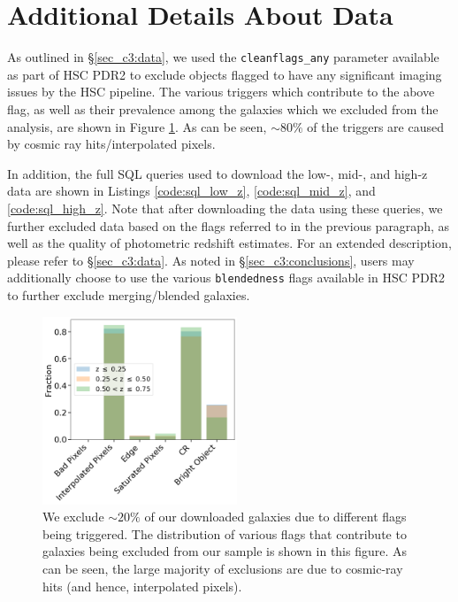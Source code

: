\section{Additional Details About Data}\label{ap:data}

As outlined in \S\ref{sec_c3:data}, we used the \texttt{cleanflags\_any} parameter available as part of HSC PDR2 to exclude objects flagged to have any significant imaging issues by the HSC pipeline. The various triggers which contribute to the above flag, as well as their prevalence among the galaxies which we excluded from the analysis, are shown in Figure \ref{fig_c3:flag_distr}. As can be seen, $\sim80\%$ of the triggers are caused by cosmic ray hits/interpolated pixels. 


In addition, the full SQL queries used to download the low-, mid-, and high-z data are shown in Listings \ref{code:sql_low_z}, \ref{code:sql_mid_z}, and \ref{code:sql_high_z}. Note that after downloading the data using these queries, we further excluded data based on the flags referred to in the previous paragraph, as well as the quality of photometric redshift estimates. For an extended description, please 
refer to \S \ref{sec_c3:data}. As noted in \S \ref{sec_c3:conclusions}, users may additionally choose to use the various \texttt{blendedness} flags available in HSC PDR2 to further exclude merging/blended galaxies. 

\begin{figure}[htb]
    \centering
    \includegraphics[width = 0.52\textwidth]{flag_distr.png}
    \caption{We exclude $\sim20\%$ of our downloaded galaxies due to different flags being triggered. The distribution of various flags that contribute to galaxies being excluded from our sample is shown in this figure. As can be seen, the large majority of exclusions are due to cosmic-ray hits (and hence, interpolated pixels). }
    \label{fig_c3:flag_distr}
\end{figure}


